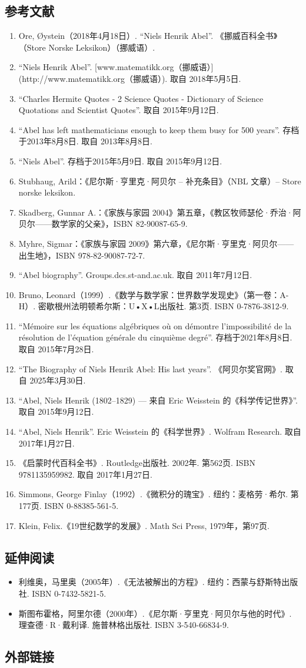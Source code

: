 \subsection{参考文献}
\begin{enumerate}
\item Ore, Øystein（2018年4月18日）. “Niels Henrik Abel”. 《挪威百科全书》（Store Norske Leksikon）（挪威语）.
\item “Niels Henrik Abel”. [www.matematikk.org（挪威语）](http://www.matematikk.org（挪威语）). 取自 2018年5月5日.
\item “Charles Hermite Quotes - 2 Science Quotes - Dictionary of Science Quotations and Scientist Quotes”. 取自 2015年9月12日.
\item “Abel has left mathematicians enough to keep them busy for 500 years”. 存档于2013年8月8日. 取自 2013年8月8日.
\item “Niels Abel”. 存档于2015年5月9日. 取自 2015年9月12日.
\item Stubhaug, Arild：《尼尔斯·亨里克·阿贝尔 – 补充条目》（NBL 文章）– Store norske leksikon.
\item Skadberg, Gunnar A.：《家族与家园 2004》第五章，《教区牧师瑟伦·乔治·阿贝尔——数学家的父亲》，ISBN 82-90087-65-9.
\item Myhre, Sigmar：《家族与家园 2009》第六章，《尼尔斯·亨里克·阿贝尔——出生地》，ISBN 978-82-90087-72-7.
\item “Abel biography”. Groups.dcs.st-and.ac.uk. 取自 2011年7月12日.
\item Bruno, Leonard（1999）.《数学与数学家：世界数学发现史》（第一卷：A-H）. 密歇根州法明顿希尔斯：U•X•L出版社. 第3页. ISBN 0-7876-3812-9.
\item “Mémoire sur les équations algébriques où on démontre l'impossibilité de la résolution de l'équation générale du cinquième degré”. 存档于2021年8月8日. 取自 2015年7月28日.
\item “The Biography of Niels Henrik Abel: His last years”. 《阿贝尔奖官网》. 取自 2025年3月30日.
\item “Abel, Niels Henrik (1802–1829) — 来自 Eric Weisstein 的《科学传记世界》”. 取自 2015年9月12日.
\item “Abel, Niels Henrik”. Eric Weisstein 的《科学世界》. Wolfram Research. 取自 2017年1月27日.
\item 《启蒙时代百科全书》. Routledge出版社. 2002年. 第562页. ISBN 9781135959982. 取自 2017年1月27日.
\item Simmons, George Finlay（1992）.《微积分的瑰宝》. 纽约：麦格劳·希尔. 第177页. ISBN 0-88385-561-5.
\item Klein, Felix.《19世纪数学的发展》. Math Sci Press, 1979年，第97页.
\end{enumerate}
\subsection{延伸阅读}
\begin{itemize}
\item 利维奥，马里奥（2005年）.《无法被解出的方程》. 纽约：西蒙与舒斯特出版社. ISBN 0-7432-5821-5.
\item 斯图布霍格，阿里尔德（2000年）.《尼尔斯·亨里克·阿贝尔与他的时代》. 理查德·R·戴利译. 施普林格出版社. ISBN 3-540-66834-9.
\end{itemize}
\subsection{外部链接}
